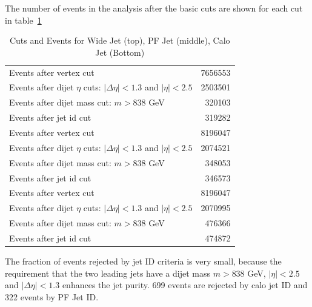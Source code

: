 The number of events in the analysis after the basic cuts are shown for
each cut in table~\ref{table:cuts}
\begin{table}[th]
  \centering
  \normalsize
  \begin{tabular}{|l|r|}
    \hline
    \hline
    Events after vertex cut                              &  7656553\\
    Events after dijet $\eta$ cuts: $|\Delta\eta|<1.3$ and $|\eta|<2.5$ & 2503501\\
    Events after dijet mass cut: $m>838$ GeV             & 320103\\
    Events after jet id cut                              & 319282\\
    \hline
    Events after vertex cut                              &  8196047\\
    Events after dijet $\eta$ cuts: $|\Delta\eta|<1.3$ and $|\eta|<2.5$ & 2074521\\
    Events after dijet mass cut: $m>838$ GeV & 348053\\
    Events after jet id cut                              & 346573\\
    \hline
    Events after vertex cut                              &  8196047\\
    Events after dijet $\eta$ cuts: $|\Delta\eta|<1.3$ and $|\eta|<2.5$ & 2070995\\
    Events after dijet mass cut: $m>838$ GeV & 476366\\
    Events after jet id cut                              & 474872\\
    \hline
  \end{tabular}
  \caption{Cuts and Events for Wide Jet (top), PF Jet (middle), Calo Jet (Bottom)}
  \label{table:cuts}
\end{table}

The fraction of events rejected by jet ID criteria is very small,
because the requirement that the two leading jets have a dijet mass
$m>838$ GeV, $|\eta|<2.5$ and $|\Delta\eta|<1.3$ enhances the jet
purity.  699 events are rejected by calo jet ID and 322 events by PF
Jet ID.



